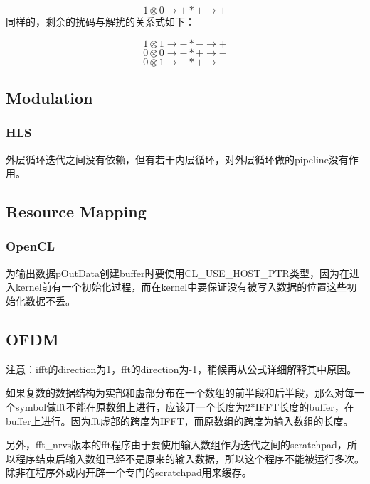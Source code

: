 \documentclass[titlepage]{article}
\numberwithin{figure}{section}
\numberwithin{equation}{section}
\begin{document}
\begin{displaymath}
1 \otimes 0 \to + * + \to +
\end{displaymath}
同样的，剩余的扰码与解扰的关系式如下：

\begin{displaymath}
1 \otimes 1 \to - * - \to +
\end{displaymath}
\begin{displaymath}
0 \otimes 0 \to - * + \to -
\end{displaymath}
\begin{displaymath}
0 \otimes 1 \to - * + \to - 
\end{displaymath}

\subsection{Modulation}

\subsubsection{HLS}

外层循环迭代之间没有依赖，但有若干内层循环，对外层循环做的pipeline没有作用。

\subsection{Resource Mapping}

\subsubsection{OpenCL}

为输出数据pOutData创建buffer时要使用CL\_USE\_HOST\_PTR类型，因为在进入kernel前有一个初始化过程，而在kernel中要保证没有被写入数据的位置这些初始化数据不丢。

\subsection{OFDM}

注意：ifft的direction为1，fft的direction为-1，稍候再从公式详细解释其中原因。

如果复数的数据结构为实部和虚部分布在一个数组的前半段和后半段，那么对每一个symbol做fft不能在原数组上进行，应该开一个长度为2*IFFT长度的buffer，在buffer上进行。因为fft虚部的跨度为IFFT，而原数组的跨度为输入数组的长度。

另外，fft\_nrvs版本的fft程序由于要使用输入数组作为迭代之间的scratchpad，所以程序结束后输入数组已经不是原来的输入数据，所以这个程序不能被运行多次。除非在程序外或内开辟一个专门的scratchpad用来缓存。
\end{document}
